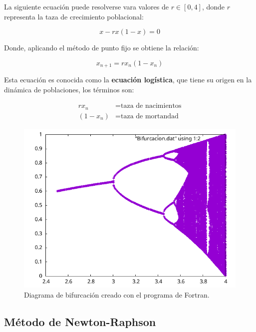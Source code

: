 \begin{ex}
	La siguiente ecuación puede resolverse vara valores de $r \in [0,4]$,
	donde $r$ representa la taza de crecimiento poblacional:

	\[
		x - rx(1 - x) = 0
	\]

	Donde, aplicando el método de punto fijo se obtiene la relación:

	\[
		x_{n+1} = r x_n (1 - x_n)
	\]

	Esta ecuación es conocida como la \textbf{ecuación logística}, que tiene
	su origen en la dinámica de poblaciones, los términos son:

	\begin{align*}
		rx_n &= \text{taza de nacimientos} \\
		(1 - x_n) &= \text{taza de mortandad}
	\end{align*}

	

	\begin{figure}
		\centering
		\includegraphics[width=1.0\textwidth]{programas/bifurcacion/bifurcacion.png}
		\caption{Diagrama de bifurcación creado con el programa de
		Fortran.}
	\end{figure}
\end{ex}

\subsection{Método de Newton-Raphson}

